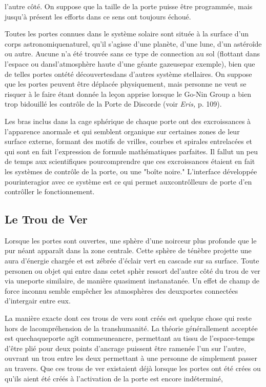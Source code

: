 l'autre côté. On suppose que la taille de la porte puisse être programmée, mais jusqu'à présent les efforts dans ce sens ont toujours échoué. 

Toutes les portes connues dans le système solaire sont située à la surface d'un corps astronomiquenaturel, qu'il s'agisse d'une planète, d'une lune, d'un astéroîde ou autre. Aucune n'a été trouvée sans ce type de connection au sol (flottant dans l'espace ou dansl'atmosphère haute d'une géante gazeusepar exemple), bien que de telles portes ontété découvertesdans d'autres système stellaires. On suppose que les portes peuvent être déplacée physiquement, mais personne ne veut se risquer à le faire étant donnée la leçon apprise lorsque le Go-Nin Group a bien trop bidouillé les contrôle de la Porte de Discorde (voir \textit{Eris, }p. 109). 

Les bras inclus dans la cage sphérique de chaque porte ont des excroissances à l'apparence anormale et qui semblent organique sur certaines zones de leur surface externe, formant des motifs de vrilles, courbes et spirales entrelacées et qui sont en fait l'expression de formule mathématiques parfaites. Il fallut un peu de temps aux scientifiques pourcomprendre que ces excroissances étaient en fait les systèmes de contrôle de la porte, ou une "boîte noire." L'interface développée pourinteragior avec ce système est ce qui permet auxcontrôlleurs de porte d'en contrôller le fonctionnement. 

\subsection{Le Trou de Ver} 

Lorsque les portes sont ouvertes, une sphère d'une noirceur plus profonde que le pur néant apparaît dans la zone centrale. Cette sphère de ténèbre projette une aura d'énergie chargée et est zébrée d'éclair vert en cascade sur sa surface. Toute personen ou objet qui entre dans cetet sphèr ressort del'autre côté du trou de ver via uneporte similaire, de manière quasiment instanatanée. Un effet de champ de force inconnu semble empêcher les atmosphères des deuxportes connectées d'intergair entre eux. 

La manière exacte dont ces trous de vers sont créés est quelque chose qui reste hors de lacompréhension de la transhumanité. La théorie générallement acceptée est quechaqueporte agît commeuneancre, permettant au tissu de l'espace-temps d'être plié pour deux points d'ancrage puissent être ramenée l'un sur l'autre, ouvrant un trou entre les deux permettant à une personne de simplement passer au travers. Que ces trous de ver existaient déjà lorsque les portes ont été crées ou qu'ils aient été créés à l'activation de la porte est encore indéterminé, 

